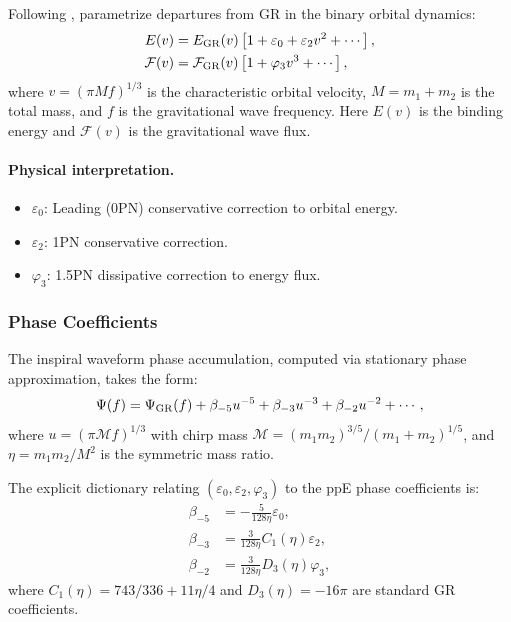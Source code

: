 Following \cite{Yunes2009}, parametrize departures from GR in the binary orbital dynamics:
\begin{align}
E(v) &= E_{\rm GR}(v)\left[1 + \varepsilon_0 + \varepsilon_2 v^2 + \cdots\right], \label{eq:ppe-energy}\\
\mathcal{F}(v) &= \mathcal{F}_{\rm GR}(v)\left[1 + \varphi_3 v^3 + \cdots\right], \label{eq:ppe-flux}
\end{align}
where $v = (\pi M f)^{1/3}$ is the characteristic orbital velocity, $M = m_1 + m_2$ is the total mass, and $f$ is the gravitational wave frequency. Here $E(v)$ is the binding energy and $\mathcal{F}(v)$ is the gravitational wave flux.

\paragraph{Physical interpretation.}
\begin{itemize}
\item $\varepsilon_0$: Leading (0PN) conservative correction to orbital energy.
\item $\varepsilon_2$: 1PN conservative correction.
\item $\varphi_3$: 1.5PN dissipative correction to energy flux.
\end{itemize}

\subsubsection{Phase Coefficients}\label{sec:gw-ppe-phase}

The inspiral waveform phase accumulation, computed via stationary phase approximation, takes the form:
\begin{equation}\label{eq:ppe-phase}
\Psi(f) = \Psi_{\rm GR}(f) + \beta_{-5}u^{-5} + \beta_{-3}u^{-3} + \beta_{-2}u^{-2} + \cdots,
\end{equation}
where $u = (\pi \mathcal{M} f)^{1/3}$ with chirp mass $\mathcal{M} = (m_1 m_2)^{3/5}/(m_1 + m_2)^{1/5}$, and $\eta = m_1 m_2/M^2$ is the symmetric mass ratio.

The explicit dictionary relating $(\varepsilon_0, \varepsilon_2, \varphi_3)$ to the ppE phase coefficients is:
\begin{align}
\beta_{-5} &= -\frac{5}{128\eta}\varepsilon_0, \label{eq:beta-5}\\
\beta_{-3} &= \frac{3}{128\eta}C_1(\eta)\varepsilon_2, \label{eq:beta-3}\\
\beta_{-2} &= \frac{3}{128\eta}D_3(\eta)\varphi_3, \label{eq:beta-2}
\end{align}
where $C_1(\eta) = 743/336 + 11\eta/4$ and $D_3(\eta) = -16\pi$ are standard GR coefficients.

